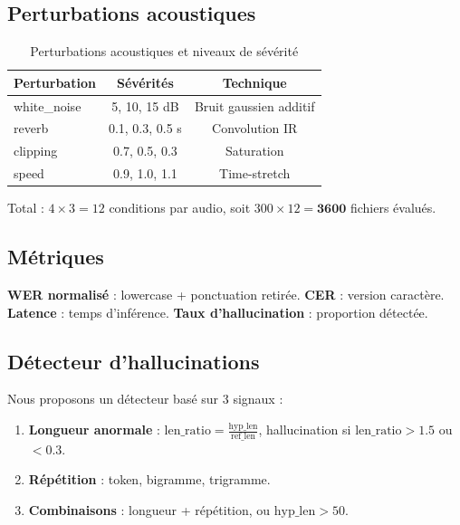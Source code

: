 \documentclass[11pt,a4paper]{article}
\begin{document}
\subsection{Perturbations acoustiques}

\begin{table}[h]
\centering
\caption{Perturbations acoustiques et niveaux de sévérité}
\label{tab:perturbations}
\begin{tabular}{lcc}
\toprule
\textbf{Perturbation} & \textbf{Sévérités} & \textbf{Technique} \\
\midrule
white\_noise & 5, 10, 15 dB & Bruit gaussien additif \\
reverb       & 0.1, 0.3, 0.5 s & Convolution IR \\
clipping     & 0.7, 0.5, 0.3 & Saturation \\
speed        & 0.9, 1.0, 1.1 & Time-stretch \\
\bottomrule
\end{tabular}
\end{table}

Total : $4 \times 3 = 12$ conditions par audio, soit
$300 \times 12 = \textbf{3600}$ fichiers évalués.

\subsection{Métriques}

\textbf{WER normalisé} : lowercase + ponctuation retirée.
\textbf{CER} : version caractère.
\textbf{Latence} : temps d'inférence.
\textbf{Taux d'hallucination} : proportion détectée.

\subsection{Détecteur d'hallucinations}

Nous proposons un détecteur basé sur 3 signaux :

\begin{enumerate}
    \item \textbf{Longueur anormale} :
    $\text{len\_ratio} = \frac{\text{hyp\_len}}{\text{ref\_len}}$,
    hallucination si $\text{len\_ratio} > 1.5$ ou $< 0.3$.
    \item \textbf{Répétition} : token, bigramme, trigramme.
    \item \textbf{Combinaisons} : longueur + répétition, ou
    $\text{hyp\_len} > 50$.
\end{enumerate}
\end{document}
